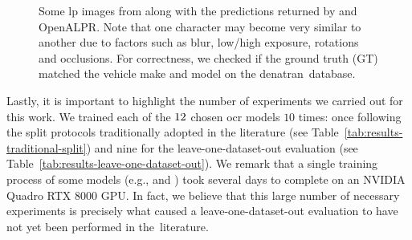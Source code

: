 \begin{figure}[!htb]
	
    \caption{Some \gls*{lp} images from \dataset along with the predictions returned by \trba and OpenALPR. Note that one character may become very similar to another due to factors such as blur, low/high exposure, rotations and occlusions.
    For correctness, we checked if the ground truth (GT) matched the vehicle make and model on the \gls*{denatran}~database.}
    \label{fig:samples-dataset-challenging}
\end{figure}

Lastly, it is important to highlight the number of experiments we carried out for this work.
We trained each of the $12$ chosen \gls*{ocr} models $10$ times: once following the split protocols traditionally adopted in the literature (see Table~\ref{tab:results-traditional-split}) and nine for the leave-one-dataset-out evaluation (see Table~\ref{tab:results-leave-one-dataset-out}).
We remark that a single training process of some models (e.g., \trba and \vitstrbase) took several days to complete on an NVIDIA Quadro RTX $8000$ GPU.
In fact, we believe that this large number of necessary experiments is precisely what caused a leave-one-dataset-out evaluation to have not yet been performed in the~literature.

